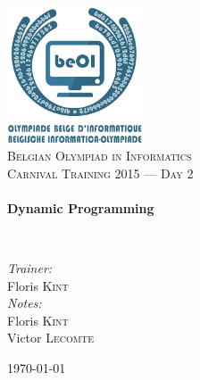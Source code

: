 \begin{titlepage}
\begin{center}

\includegraphics[width=0.3\textwidth]{./img/beoi-logo}~\\[1cm]

\textsc{\LARGE Belgian Olympiad in Informatics}\\[1.5cm]

\textsc{\Large Carnival Training 2015 --- Day 2}\\[0.5cm]

\HRule \\[0.4cm]
{ \huge \bfseries Dynamic Programming  \\[0.4cm] }

\HRule \\[1.5cm]

\begin{center} \large
\emph{Trainer:}\\
Floris \textsc{Kint}\\
\emph{Notes:}\\
Floris \textsc{Kint}\\
Victor \textsc{Lecomte}
\end{center}

\vfill

{\large \today}

\end{center}
\end{titlepage}
